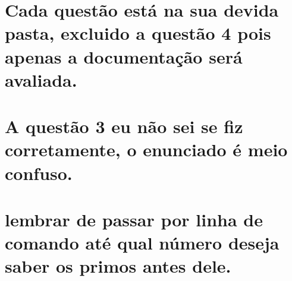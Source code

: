 \section*{Cada questão está na sua devida pasta, excluido a questão 4 pois apenas a documentação será avaliada.}

\section*{A questão 3 eu não sei se fiz corretamente, o enunciado é meio confuso.}

\section*{lembrar de passar por linha de comando até qual número deseja saber os primos antes dele.}